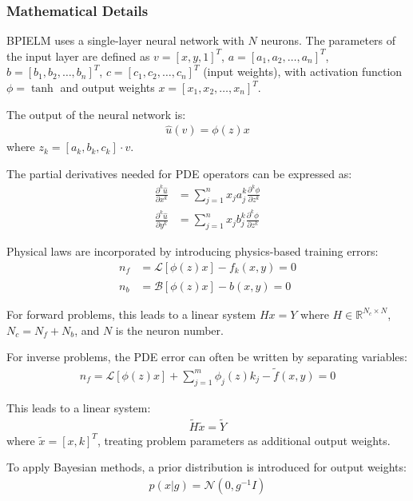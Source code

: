 \documentclass[11pt]{article}
\begin{document}
\subsubsection{Mathematical Details}

BPIELM uses a single-layer neural network with $N$ neurons. The parameters of the input layer are defined as $v = [x, y, 1]^T$, $a = [a_1, a_2, \ldots, a_n]^T$, $b = [b_1, b_2, \ldots, b_n]^T$, $c = [c_1, c_2, \ldots, c_n]^T$ (input weights), with activation function $\phi = \tanh$ and output weights $x = [x_1, x_2, \ldots, x_n]^T$.

The output of the neural network is:
\begin{align}
    \hat{u}(v) = \phi(z)x
\end{align}
where $z_k = [a_k, b_k, c_k] \cdot v$.

The partial derivatives needed for PDE operators can be expressed as:
\begin{align}
    \frac{\partial^k \hat{u}}{\partial x^k} &= \sum_{j=1}^{n} x_j a_j^k \frac{\partial^k \phi}{\partial z^k} \\
    \frac{\partial^k \hat{u}}{\partial y^k} &= \sum_{j=1}^{n} x_j b_j^k \frac{\partial^k \phi}{\partial z^k}
\end{align}

Physical laws are incorporated by introducing physics-based training errors:
\begin{align}
    n_f &= \mathcal{L}[\phi(z)x] - f_k(x,y) = 0 \\
    n_b &= \mathcal{B}[\phi(z)x] - \hat{b}(x,y) = 0
\end{align}

For forward problems, this leads to a linear system $Hx = Y$ where $H \in \mathbb{R}^{N_c \times N}$, $N_c = N_f + N_b$, and $N$ is the neuron number.

For inverse problems, the PDE error can often be written by separating variables:
\begin{align}
    n_f = \mathcal{L}[\phi(z)x] + \sum_{j=1}^{m} \phi_j(z)k_j - \tilde{f}(x,y) = 0
\end{align}

This leads to a linear system:
\begin{align}
    \tilde{H}\tilde{x} = \tilde{Y}
\end{align}
where $\tilde{x} = [x, k]^T$, treating problem parameters as additional output weights.

To apply Bayesian methods, a prior distribution is introduced for output weights:
\begin{align}
    p(x|g) = \mathcal{N}(0, g^{-1}I)
\end{align}
\end{document}
